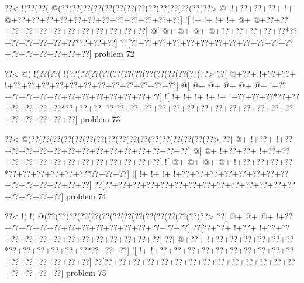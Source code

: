 \vbox{\vbox{\goo
\0??<\- !(\0??(\0??(\- @(\0??(\0??(\0??(\0??(\0??(\0??(\0??(\0??(\0??(\0??(\0??(\0??(\0??(\0??>
\- @[\- !+\0??+\0??+\0??+\- !+\- @+\0??+\0??+\0??+\0??+\0??+\0??+\0??+\0??+\0??+\0??+\0??+\0??]
\- ![\- !+\- !+\- !+\- !+\- @+\- @+\0??+\0??+\0??+\0??+\0??+\0??+\0??+\0??+\0??+\0??+\0??+\0??]
\- @[\- @+\- @+\- @+\- @+\0??+\0??+\0??+\0??+\0??*\0??+\0??+\0??+\0??+\0??+\0??*\0??+\0??+\0??]
\0??[\0??+\0??+\0??+\0??+\0??+\0??+\0??+\0??+\0??+\0??+\0??+\0??+\0??+\0??+\0??+\0??+\0??+\0??]
}
\hfil problem 72\hfil\break
}



\vbox{\vbox{\goo
\0??<\- @(\- !(\0??(\0??(\- !(\0??(\0??(\0??(\0??(\0??(\0??(\0??(\0??(\0??(\0??(\0??(\0??(\0??>
\0??[\- @+\0??+\- !+\0??+\0??+\- !+\0??+\0??+\0??+\0??+\0??+\0??+\0??+\0??+\0??+\0??+\0??+\0??]
\- @[\- @+\- @+\- @+\- @+\- @+\- !+\0??+\0??+\0??+\0??+\0??+\0??+\0??+\0??+\0??+\0??+\0??+\0??]
\- ![\- !+\- !+\- !+\- !+\- !+\- !+\0??+\0??+\0??*\0??+\0??+\0??+\0??+\0??+\0??*\0??+\0??+\0??]
\0??[\0??+\0??+\0??+\0??+\0??+\0??+\0??+\0??+\0??+\0??+\0??+\0??+\0??+\0??+\0??+\0??+\0??+\0??]
}
\hfil problem 73\hfil\break
}



\vbox{\vbox{\goo
\0??<\- @(\0??(\0??(\0??(\0??(\0??(\0??(\0??(\0??(\0??(\0??(\0??(\0??(\0??(\0??(\0??(\0??(\0??>
\0??[\- @+\- !+\0??+\- !+\0??+\0??+\0??+\0??+\0??+\0??+\0??+\0??+\0??+\0??+\0??+\0??+\0??+\0??]
\- @[\- @+\- !+\0??+\0??+\- !+\0??+\0??+\0??+\0??+\0??+\0??+\0??+\0??+\0??+\0??+\0??+\0??+\0??]
\- ![\- @+\- @+\- @+\- @+\- !+\0??+\0??+\0??+\0??*\0??+\0??+\0??+\0??+\0??+\0??*\0??+\0??+\0??]
\- ![\- !+\- !+\- !+\- !+\0??+\0??+\0??+\0??+\0??+\0??+\0??+\0??+\0??+\0??+\0??+\0??+\0??+\0??]
\0??[\0??+\0??+\0??+\0??+\0??+\0??+\0??+\0??+\0??+\0??+\0??+\0??+\0??+\0??+\0??+\0??+\0??+\0??]
}
\hfil problem 74\hfil\break
}



\vbox{\vbox{\goo
\0??<\- !(\- !(\- @(\0??(\0??(\0??(\0??(\0??(\0??(\0??(\0??(\0??(\0??(\0??(\0??(\0??(\0??(\0??>
\0??[\- @+\- @+\- @+\- !+\0??+\0??+\0??+\0??+\0??+\0??+\0??+\0??+\0??+\0??+\0??+\0??+\0??+\0??]
\0??[\0??+\0??+\- !+\0??+\- !+\0??+\0??+\0??+\0??+\0??+\0??+\0??+\0??+\0??+\0??+\0??+\0??+\0??]
\0??[\- @+\0??+\- !+\0??+\0??+\0??+\0??+\0??+\0??*\0??+\0??+\0??+\0??+\0??+\0??*\0??+\0??+\0??]
\- ![\- !+\- !+\0??+\0??+\0??+\0??+\0??+\0??+\0??+\0??+\0??+\0??+\0??+\0??+\0??+\0??+\0??+\0??]
\0??[\0??+\0??+\0??+\0??+\0??+\0??+\0??+\0??+\0??+\0??+\0??+\0??+\0??+\0??+\0??+\0??+\0??+\0??]
}
\hfil problem 75\hfil\break
}



